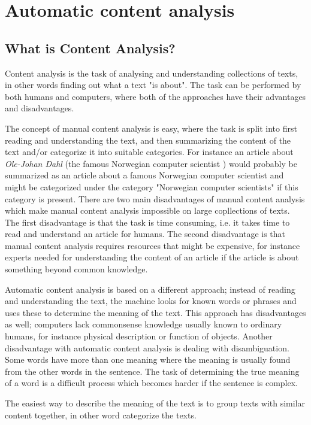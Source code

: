 \section{Automatic content analysis}

\subsection{What is Content Analysis?}
Content analysis is the task of analysing and understanding collections of texts, in other words finding out what a text "is about". The task can be performed by both humans and computers, where both of the approaches have their advantages and disadvantages.

The concept of manual content analysis is easy, where the task is split into first reading and understanding the text, and then summarizing the content of the text and/or categorize it into suitable categories. For instance an article about \emph{Ole-Johan Dahl} (the famous Norwegian computer scientist \cite{Olejohandahleng}) would probably be summarized as an article about a famous Norwegian computer scientist and might be categorized under the category "Norwegian computer scientists" if this category is present.  
There are two main disadvantages of manual content analysis which make manual content analysis impossible on large copllections of texts. The first disadvantage is that the task is time consuming, i.e. it takes time to read and understand an article for humans. The second disadvantage is that manual content analysis requires resources that might be expensive, for instance experts needed for understanding the content of an article if the article is about something beyond common knowledge.

Automatic content analysis is based on a different approach; instead of reading and understanding the text, the machine looks for known words or phrases and uses these to determine the meaning of the text. This approach has disadvantages as well; computers lack commonsense knowledge usually known to ordinary humans, for instance physical description or function of objects. Another disadvantage with automatic content analysis is dealing with disambiguation. Some words have more than one meaning where the meaning is usually found from the other words in the sentence. The task of determining the true meaning of a word is a difficult process which becomes harder if the sentence is complex. 

The easiest way to describe the meaning of the text is to group texts with similar content together, in other word categorize the texts. 




